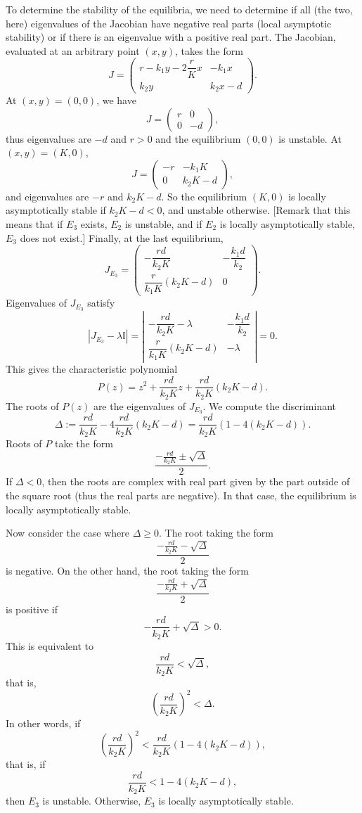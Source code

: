 \documentclass[12pt]{exam}
\begin{document}
\begin{questions}
\begin{parts}
\begin{solution}
To determine the stability of the equilibria, we need to determine if all (the two, here) eigenvalues of the Jacobian have negative real parts (local asymptotic stability) or if there is an eigenvalue with a positive real part.
The Jacobian, evaluated at an arbitrary point $(x,y)$, takes the form
\[
J=\begin{pmatrix}
r-k_1y-2\dfrac rK x & -k_1x \\
k_2 y & k_2x-d
\end{pmatrix}.
\]
At $(x,y)=(0,0)$, we have 
\[
J=\begin{pmatrix}
r & 0 \\
0 & -d
\end{pmatrix},
\]
thus eigenvalues are $-d$ and $r>0$ and the equilibrium $(0,0)$ is unstable.
At $(x,y)=(K,0)$,
\[
J=\begin{pmatrix}
-r & -k_1K \\
0 & k_2K-d
\end{pmatrix},
\]
and eigenvalues are $-r$ and $k_2K-d$. So the equilibrium $(K,0)$ is locally asymptotically stable if $k_2K-d<0$, and unstable otherwise. [Remark that this means that if $E_3$ exists, $E_2$ is unstable, and if $E_2$ is locally asymptotically stable, $E_3$ does not exist.] Finally, at the last equilibrium,
\[
J_{E_3}=\begin{pmatrix}
-\dfrac{rd}{k_2K} & -\dfrac{k_1d}{k_2} \\
\dfrac{r}{k_1K}(k_2K-d) & 0
\end{pmatrix}.
\]
Eigenvalues of $J_{E_3}$ satisfy
\[
|J_{E_3}-\lambda\mathbb{I}|=\left|\begin{matrix}
-\dfrac{rd}{k_2K}-\lambda & -\dfrac{k_1d}{k_2} \\
\dfrac{r}{k_1K}(k_2K-d) & -\lambda
\end{matrix}
\right|=0.
\]
This gives the characteristic polynomial
\[
P(z)=z^2+\frac{rd}{k_2K}z+\frac{rd}{k_2K}(k_2K-d).
\]
The roots of $P(z)$ are the eigenvalues of $J_{E_3}$. We compute the discriminant
\[
\Delta:=\frac{rd}{k_2K}-4\frac{rd}{k_2K}(k_2K-d)=\frac{rd}{k_2K}(1-4(k_2K-d)).
\]
Roots of $P$ take the form
\[
\frac{-\frac{rd}{k_2K}\pm\sqrt{\Delta}}2.
\]
If $\Delta<0$, then the roots are complex with real part given by the part outside of the square root (thus the real parts are negative). In that case, the equilibrium is locally asymptotically stable.

Now consider the case where $\Delta\geq 0$. The root taking the form
\[
\frac{-\frac{rd}{k_2K}-\sqrt{\Delta}}2
\]
is negative. On the other hand, the root taking the form
\[
\frac{-\frac{rd}{k_2K}+\sqrt{\Delta}}2
\]
is positive if
\[
-\frac{rd}{k_2K}+\sqrt{\Delta}>0.
\]
This is equivalent to
\[
\frac{rd}{k_2K}<\sqrt{\Delta},
\]
that is,
\[
\left(\frac{rd}{k_2K}\right)^2<\Delta.
\]
In other words, if
\[
\left(\frac{rd}{k_2K}\right)^2<\frac{rd}{k_2K}(1-4(k_2K-d)),
\]
that is, if
\[
\frac{rd}{k_2K}<1-4(k_2K-d),
\]
then $E_3$ is unstable. Otherwise, $E_3$ is locally asymptotically stable.
\end{solution}

\end{parts}
\end{questions}
\end{document}
